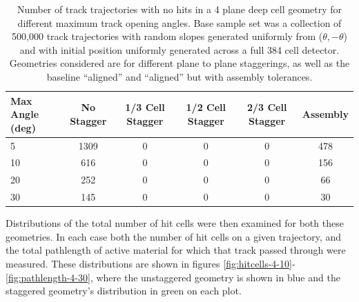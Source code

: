 \begin{table}[tb]
\begin{center}
\begin{tabular}{|l|c|c|c|c|c|}
\hline
Max Angle (deg)                 & No Stagger     & 1/3 Cell Stagger & 1/2 Cell Stagger & 2/3 Cell Stagger & Assembly\\
\hline
5                               & 1309           & 0                & 0                & 0                & 478  \\
10                              & 616            & 0                & 0                & 0                & 156  \\
20                              & 252            & 0                & 0                & 0                & 66   \\
30                              & 145            & 0                & 0                & 0                & 30   \\
\hline
\end{tabular}
\caption[4 Cell Missed Hits]{Number of track trajectories with no hits in a 4 plane deep cell geometry for different maximum track opening angles.  Base sample set was a collection of 500,000 track trajectories with random slopes generated uniformly from ($\theta,-\theta$) and with initial position uniformly generated across a full 384 cell detector.  Geometries considered are for different plane to plane staggerings, as well as the baseline ``aligned'' and ``aligned'' but with assembly tolerances.}
\label{table:no-hits-4cell}
\end{center}
\end{table}

Distributions of the total number of hit cells were then examined for both these geometries.  In each case both the number of hit cells on a given trajectory, and the total pathlength of active material for which that track passed through were measured.  These distributions are shown in figures \ref{fig:hitcells-4-10}-\ref{fig:pathlength-4-30}, where the unstaggered geometry is shown in blue and the staggered geometry's distribution in green on each plot.

